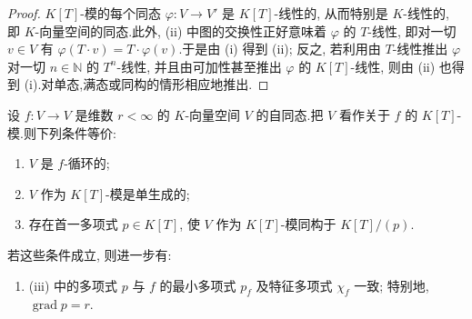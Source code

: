 \begin{proof}
$K[T]$-模的每个同态 $\varphi \colon V \longrightarrow V'$ 是 $K[T]$-线性的, 从而特别是 $K$-线性的, 即 $K$-向量空间的同态.此外, (ii) 中图的交换性正好意味着 $\varphi$ 的 $T$-线性, 即对一切 $v \in V$ 有 $\varphi(T \cdot v) = T \cdot \varphi(v)$.于是由 (i) 得到 (ii); 反之, 若利用由 $T$-线性推出 $\varphi$ 对一切 $n \in \mathbb{N}$ 的 $T^n$-线性, 并且由可加性甚至推出 $\varphi$ 的 $K[T]$-线性, 则由 (ii) 也得到 (i).对单态,满态或同构的情形相应地推出.
\end{proof}

\begin{theorem}\label{thm:6.5.4}
设 $f \colon V \longrightarrow V$ 是维数 $r < \infty$ 的 $K$-向量空间 $V$ 的自同态.把 $V$ 看作关于 $f$ 的 $K[T]$-模.则下列条件等价:
\begin{enumerate}
\item[(i)] $V$ 是 $f$-循环的;
\item[(ii)] $V$ 作为 $K[T]$-模是单生成的;
\item[(iii)] 存在首一多项式 $p \in K[T]$, 使 $V$ 作为 $K[T]$-模同构于 $K[T]/(p)$.
\end{enumerate}
若这些条件成立, 则进一步有:
\begin{enumerate}
\item[(iv)] (iii) 中的多项式 $p$ 与 $f$ 的最小多项式 $p_f$ 及特征多项式 $\chi_f$ 一致; 特别地, $\operatorname{grad} p = r$.
\end{enumerate}
\end{theorem}

